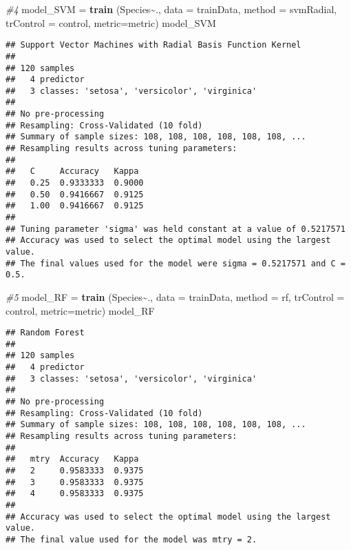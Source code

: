 \documentclass[
]{article}
\newenvironment{Shaded}{\begin{snugshade}}{\end{snugshade}}
\newcommand{\AttributeTok}[1]{\textcolor[rgb]{0.13,0.29,0.53}{#1}}
\newcommand{\CommentTok}[1]{\textcolor[rgb]{0.56,0.35,0.01}{\textit{#1}}}
\newcommand{\FunctionTok}[1]{\textcolor[rgb]{0.13,0.29,0.53}{\textbf{#1}}}
\newcommand{\NormalTok}[1]{#1}
\newcommand{\OtherTok}[1]{\textcolor[rgb]{0.56,0.35,0.01}{#1}}
\newcommand{\SpecialCharTok}[1]{\textcolor[rgb]{0.81,0.36,0.00}{\textbf{#1}}}
\newcommand{\StringTok}[1]{\textcolor[rgb]{0.31,0.60,0.02}{#1}}
\begin{document}
\begin{Shaded}
\begin{Highlighting}[]
\CommentTok{\#4}
\NormalTok{model\_SVM }\OtherTok{=} \FunctionTok{train}\NormalTok{ (Species}\SpecialCharTok{\textasciitilde{}}\NormalTok{., }\AttributeTok{data =}\NormalTok{ trainData, }\AttributeTok{method =} \StringTok{\textquotesingle{}svmRadial\textquotesingle{}}\NormalTok{, }\AttributeTok{trControl =}\NormalTok{ control, }\AttributeTok{metric=}\NormalTok{metric)}
\NormalTok{model\_SVM}
\end{Highlighting}
\end{Shaded}

\begin{verbatim}
## Support Vector Machines with Radial Basis Function Kernel 
## 
## 120 samples
##   4 predictor
##   3 classes: 'setosa', 'versicolor', 'virginica' 
## 
## No pre-processing
## Resampling: Cross-Validated (10 fold) 
## Summary of sample sizes: 108, 108, 108, 108, 108, 108, ... 
## Resampling results across tuning parameters:
## 
##   C     Accuracy   Kappa 
##   0.25  0.9333333  0.9000
##   0.50  0.9416667  0.9125
##   1.00  0.9416667  0.9125
## 
## Tuning parameter 'sigma' was held constant at a value of 0.5217571
## Accuracy was used to select the optimal model using the largest value.
## The final values used for the model were sigma = 0.5217571 and C = 0.5.
\end{verbatim}

\begin{Shaded}
\begin{Highlighting}[]
\CommentTok{\#5}
\NormalTok{model\_RF }\OtherTok{=} \FunctionTok{train}\NormalTok{ (Species}\SpecialCharTok{\textasciitilde{}}\NormalTok{., }\AttributeTok{data =}\NormalTok{ trainData, }\AttributeTok{method =} \StringTok{\textquotesingle{}rf\textquotesingle{}}\NormalTok{, }\AttributeTok{trControl =}\NormalTok{ control, }\AttributeTok{metric=}\NormalTok{metric)}
\NormalTok{model\_RF}
\end{Highlighting}
\end{Shaded}

\begin{verbatim}
## Random Forest 
## 
## 120 samples
##   4 predictor
##   3 classes: 'setosa', 'versicolor', 'virginica' 
## 
## No pre-processing
## Resampling: Cross-Validated (10 fold) 
## Summary of sample sizes: 108, 108, 108, 108, 108, 108, ... 
## Resampling results across tuning parameters:
## 
##   mtry  Accuracy   Kappa 
##   2     0.9583333  0.9375
##   3     0.9583333  0.9375
##   4     0.9583333  0.9375
## 
## Accuracy was used to select the optimal model using the largest value.
## The final value used for the model was mtry = 2.
\end{verbatim}
\end{document}
